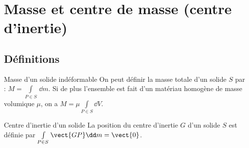 \def\xxactivite{Cours}
\def\xxauteur{\textsl{Xavier Pessoles}}

\fichefalse
\proftrue
\tdfalse
\courstrue

\def\xxnumchapitre{Chapitre 3 \vspace{.2cm}}
\def\xxchapitre{\hspace{.12cm} Caractérisation inertielle des solides}

\def\xxcompetences{%
\textsl{%
\textbf{Savoirs et compétences :}\\
\begin{itemize}[label=\ding{112},font=\color{ocre}] 
\item B2-10 : Déterminer les caractéristiques d'un solide ou d'un ensemble de solides indéformables.
\end{itemize}
}}


\def\xxfigures{
\texttt{[image: fig\_01]}\\
\textit{Toupie}

\texttt{[image: fig\_02]}\\
\textit{Volants d'inertie d'un vilebrequin}
}%



\setlength{\columnseprule}{.1pt}

\vspace{2cm}
\pagestyle{fancy}
\thispagestyle{plain}


\section{Masse et centre de masse (centre d'inertie)}
\subsection{Définitions}
\begin{defi}{Masse d'un solide indéformable}
On peut définir la masse totale d'un solide $S$ par : $M=\int\limits_{P\in S} \,\dd m$. Si de plus l'ensemble est fait d'un matériau homogène de masse volumique $\mu$, on a $M=\mu \int\limits_{P\in S} \dd V$. \end{defi}


\begin{defi}{Centre d'inertie d'un solide}
La position du centre d'inertie $G$ d'un solide $S$ est définie par $\int\limits_{P\in S} \vect{GP} \dd m = \vect{0}$.
\end{defi}

